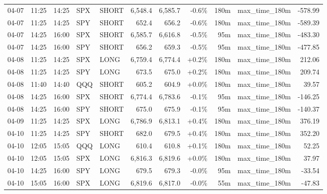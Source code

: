 \documentclass[11pt,a4paper,twoside]{article}
\begin{document}
\begin{center}
\begin{longtable}{>{\color{txtmain}}l l l l l r r r r >{\color{txtmain}}l r}
04-07 & 11:25 & 14:25 & SPX & SHORT & 6,548.4 & 6,585.7 & \textcolor{lossred}{-0.6\%} & 180m & max\_time\_180m & \textcolor{lossred}{-578.99} \\
04-07 & 11:25 & 14:25 & SPY & SHORT & 652.4 & 656.2 & \textcolor{lossred}{-0.6\%} & 180m & max\_time\_180m & \textcolor{lossred}{-589.39} \\
04-07 & 14:25 & 16:00 & SPX & SHORT & 6,585.7 & 6,616.8 & \textcolor{lossred}{-0.5\%} & 95m & max\_time\_180m & \textcolor{lossred}{-483.30} \\
04-07 & 14:25 & 16:00 & SPY & SHORT & 656.2 & 659.3 & \textcolor{lossred}{-0.5\%} & 95m & max\_time\_180m & \textcolor{lossred}{-477.85} \\
04-08 & 11:25 & 14:25 & SPX & LONG & 6,759.4 & 6,774.4 & \textcolor{wingreen}{+0.2\%} & 180m & max\_time\_180m & \textcolor{wingreen}{212.06} \\
04-08 & 11:25 & 14:25 & SPY & LONG & 673.5 & 675.0 & \textcolor{wingreen}{+0.2\%} & 180m & max\_time\_180m & \textcolor{wingreen}{209.74} \\
04-08 & 11:40 & 14:40 & QQQ & SHORT & 605.2 & 604.9 & \textcolor{wingreen}{+0.0\%} & 180m & max\_time\_180m & \textcolor{wingreen}{39.57} \\
04-08 & 14:25 & 16:00 & SPX & SHORT & 6,774.4 & 6,783.6 & \textcolor{lossred}{-0.1\%} & 95m & max\_time\_180m & \textcolor{lossred}{-146.25} \\
04-08 & 14:25 & 16:00 & SPY & SHORT & 675.0 & 675.9 & \textcolor{lossred}{-0.1\%} & 95m & max\_time\_180m & \textcolor{lossred}{-140.37} \\
04-09 & 11:25 & 14:25 & SPX & LONG & 6,786.9 & 6,813.1 & \textcolor{wingreen}{+0.4\%} & 180m & max\_time\_180m & \textcolor{wingreen}{376.19} \\
04-10 & 11:25 & 14:25 & SPY & SHORT & 682.0 & 679.5 & \textcolor{wingreen}{+0.4\%} & 180m & max\_time\_180m & \textcolor{wingreen}{352.20} \\
04-10 & 12:05 & 15:05 & QQQ & LONG & 610.4 & 610.8 & \textcolor{wingreen}{+0.1\%} & 180m & max\_time\_180m & \textcolor{wingreen}{52.25} \\
04-10 & 12:05 & 15:05 & SPX & LONG & 6,816.3 & 6,819.6 & \textcolor{wingreen}{+0.0\%} & 180m & max\_time\_180m & \textcolor{wingreen}{37.97} \\
04-10 & 14:25 & 16:00 & SPY & LONG & 679.5 & 679.3 & \textcolor{lossred}{-0.0\%} & 95m & max\_time\_180m & \textcolor{lossred}{-33.54} \\
04-10 & 15:05 & 16:00 & SPX & LONG & 6,819.6 & 6,817.0 & \textcolor{lossred}{-0.0\%} & 55m & max\_time\_180m & \textcolor{lossred}{-47.83} \\

\end{longtable}
\end{center}
\end{document}
